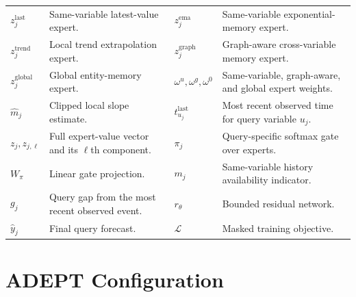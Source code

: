 \documentclass[preprint,12pt]{elsarticle}
\begin{document}
\begin{table}[!htbp]
\begin{tabular}{p{}p{}p{}p{}}
$z^{\mathrm{last}}_j$ & Same-variable latest-value expert. &
$z^{\mathrm{ema}}_j$ & Same-variable exponential-memory expert. \\
$z^{\mathrm{trend}}_j$ & Local trend extrapolation expert. &
$z^{\mathrm{graph}}_j$ & Graph-aware cross-variable memory expert. \\
$z^{\mathrm{global}}_j$ & Global entity-memory expert. &
$\omega^u,\omega^g,\omega^0$ & Same-variable, graph-aware, and global expert weights. \\
$\widehat m_j$ & Clipped local slope estimate. &
$t^{\mathrm{last}}_{u_j}$ & Most recent observed time for query variable $u_j$. \\
$z_j,z_{j,\ell}$ & Full expert-value vector and its $\ell$th component. &
$\pi_j$ & Query-specific softmax gate over experts. \\
$W_\pi$ & Linear gate projection. &
$m_j$ & Same-variable history availability indicator. \\
$g_j$ & Query gap from the most recent observed event. &
$r_\theta$ & Bounded residual network. \\
$\widehat y_j$ & Final query forecast. &
$\mathcal L$ & Masked training objective. \\
\bottomrule
\end{tabular}
\end{table}

\section{ADEPT Configuration}
\label{app:adept-config}
\end{document}
